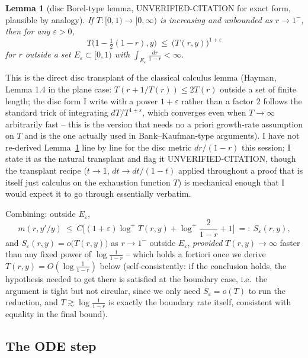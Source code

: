\documentclass[11pt]{article}
\newtheorem{lemma}[theorem]{Lemma}
\theoremstyle{remark}
\begin{document}
\begin{lemma}[disc Borel-type lemma, UNVERIFIED-CITATION for exact form, plausible by analogy]
\label{lem:borel}
If $T:[0,1)\to[0,\infty)$ is increasing and unbounded as $r\to1^-$, then for any $\varepsilon>0$,
\[
T\big(1-\tfrac12(1-r),y\big)\ \le\ \big(T(r,y)\big)^{1+\varepsilon}
\]
for $r$ outside a set $E_\varepsilon\subset[0,1)$ with $\int_{E_\varepsilon}\frac{dr}{1-r}<\infty$.
\end{lemma}

This is the direct disc transplant of the classical calculus lemma (Hayman, Lemma 1.4 in the plane
case: $T(r+1/T(r))\le2T(r)$ outside a set of finite length; the disc form I write with a power
$1+\varepsilon$ rather than a factor $2$ follows the standard trick of integrating $dT/T^{1+\varepsilon}$,
which converges even when $T\to\infty$ arbitrarily fast -- this is the version that needs no a
priori growth-rate assumption on $T$ and is the one actually used in Bank--Kaufman-type arguments).
I have not re-derived Lemma~\ref{lem:borel} line by line for the disc metric $dr/(1-r)$ this
session; I state it as the natural transplant and flag it UNVERIFIED-CITATION, though the
transplant recipe ($t\to1$, $dt\to dt/(1-t)$ applied throughout a proof that is itself just calculus
on the exhaustion function $T$) is mechanical enough that I would expect it to go through
essentially verbatim.

Combining: outside $E_\varepsilon$,
\[
m(r,y'/y)\ \le\ C\Big[(1+\varepsilon)\log^+T(r,y)+\log^+\frac2{1-r}+1\Big]\ =:\ S_\varepsilon(r,y),
\]
and $S_\varepsilon(r,y)=o\big(T(r,y)\big)$ as $r\to1^-$ outside $E_\varepsilon$, \emph{provided}
$T(r,y)\to\infty$ faster than any fixed power of $\log\frac1{1-r}$ -- which holds a fortiori once we
derive $T(r,y)=O(\log\frac1{1-r})$ below (self-consistently: if the conclusion holds, the hypothesis
needed to get there is satisfied at the boundary case, i.e.\ the argument is tight but not
circular, since we only need $S_\varepsilon=o(T)$ to run the reduction, and $T\gtrsim\log\frac1{1-r}$
is exactly the boundary rate itself, consistent with equality in the final bound).

\subsection{The ODE step}
\end{document}
